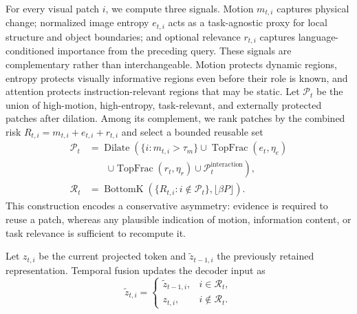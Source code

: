 \documentclass[letterpaper, 10 pt, conference]{ieeeconf}
\begin{document}
For every visual patch $i$, we compute three signals. Motion $m_{t,i}$ captures
physical change; normalized image entropy $e_{t,i}$ acts as a task-agnostic
proxy for local structure and object boundaries; and optional relevance
$r_{t,i}$ captures language-conditioned importance from the preceding query.
These signals are complementary rather than interchangeable. Motion protects
dynamic regions, entropy protects visually informative regions even before
their role is known, and attention protects instruction-relevant regions that
may be static.
Let $\mathcal P_t$ be the union of high-motion, high-entropy, task-relevant,
and externally protected patches after dilation. Among its complement, we rank
patches by the combined risk $R_{t,i}=m_{t,i}+e_{t,i}+r_{t,i}$ and select a
bounded reusable set
\begin{equation}
\begin{aligned}
\mathcal P_t
&=\operatorname{Dilate}\!\left(
    \{i:m_{t,i}>\tau_m\}
    \cup \operatorname{TopFrac}(e_t,\eta_e)\right.\\
&\qquad\left.
    \cup \operatorname{TopFrac}(r_t,\eta_r)
    \cup \mathcal P_t^{\mathrm{interaction}}
    \right),\\
\mathcal R_t
&=\operatorname{BottomK}\!\left(
    \{R_{t,i}:i\notin\mathcal P_t\},
    \lfloor\beta P\rfloor
    \right).
\end{aligned}
\label{eq:interaction_selector}
\end{equation}
This construction encodes a conservative asymmetry: evidence is required to
reuse a patch, whereas any plausible indication of motion, information content,
or task relevance is sufficient to recompute it.

Let $z_{t,i}$ be the current projected token and
$\widetilde z_{t-1,i}$ the previously retained representation. Temporal fusion
updates the decoder input as
\begin{equation}
    \widetilde z_{t,i}=
    \begin{cases}
      \widetilde z_{t-1,i},&i\in\mathcal R_t,\\
      z_{t,i},&i\notin\mathcal R_t.
    \end{cases}
    \label{eq:temporal_fusion}
\end{equation}
\end{document}
